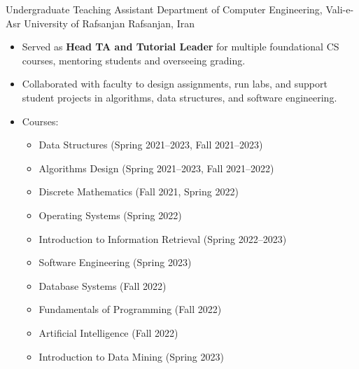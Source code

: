 \documentclass[10pt,a4paper,sans]{moderncv}        %
\begin{document}
  {Undergraduate Teaching Assistant}
  {Department of Computer Engineering, Vali-e-Asr University of Rafsanjan}
  {Rafsanjan, Iran}
  {}
  {\begin{itemize}%
    \item Served as \textbf{Head TA and Tutorial Leader} for multiple foundational CS courses, mentoring students and overseeing grading.
    \item Collaborated with faculty to design assignments, run labs, and support student projects in algorithms, data structures, and software engineering.
    \item Courses:  \vspace{-\baselineskip}
      \begin{multicols}{2}
        \begin{itemize}
          \item Data Structures (Spring 2021–2023, Fall 2021–2023)
          \item Algorithms Design (Spring 2021–2023, Fall 2021–2022)
          \item Discrete Mathematics (Fall 2021, Spring 2022)
          \item Operating Systems (Spring 2022)
          \item Introduction to Information Retrieval (Spring 2022–2023)
          \item Software Engineering (Spring 2023)
          \item Database Systems (Fall 2022)
          \item Fundamentals of Programming (Fall 2022)
          \item Artificial Intelligence (Fall 2022)
          \item Introduction to Data Mining (Spring 2023)
        \end{itemize}
      \end{multicols}
  \end{itemize}}
\end{document}
